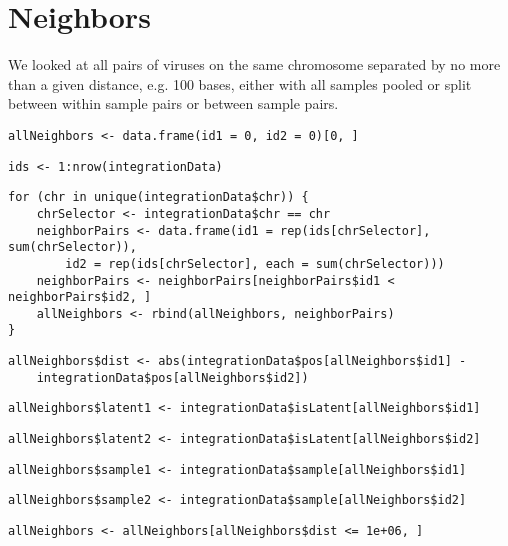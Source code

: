 \documentclass[../../sherrill-Mix_thesis.tex]{subfiles}
\makeatletter
\newenvironment{kframe}{%
 \def\at@end@of@kframe{}%
 \ifinner\ifhmode%
  \def\at@end@of@kframe{\end{minipage}}%
  \begin{minipage}{\columnwidth}%
 \fi\fi%
 \def\FrameCommand##1{\hskip\@totalleftmargin \hskip-\fboxsep
 \colorbox{shadecolor}{##1}\hskip-\fboxsep
     \hskip-\linewidth \hskip-\@totalleftmargin \hskip\columnwidth}%
 \MakeFramed {\advance\hsize-\width
   \@totalleftmargin\z@ \linewidth\hsize
   \@setminipage}}%
 {\par\unskip\endMakeFramed%
 \at@end@of@kframe}
\newenvironment{knitrout}{}{} %
\makeatother
\begin{document}
\section{Neighbors}
We looked at all pairs of viruses on the same chromosome separated by no more than a given distance, e.g. 100 bases, either with all samples pooled or split between within sample pairs or between sample pairs.
\begin{knitrout}
\color{fgcolor}\begin{kframe}
\begin{lstlisting}[basicstyle=\ttfamily,breaklines=true]
allNeighbors <- data.frame(id1 = 0, id2 = 0)[0, ]\end{lstlisting}
\begin{lstlisting}[basicstyle=\ttfamily,breaklines=true]
ids <- 1:nrow(integrationData)\end{lstlisting}
\begin{lstlisting}[basicstyle=\ttfamily,breaklines=true]
for (chr in unique(integrationData$chr)) {
    chrSelector <- integrationData$chr == chr
    neighborPairs <- data.frame(id1 = rep(ids[chrSelector], sum(chrSelector)), 
        id2 = rep(ids[chrSelector], each = sum(chrSelector)))
    neighborPairs <- neighborPairs[neighborPairs$id1 < neighborPairs$id2, ]
    allNeighbors <- rbind(allNeighbors, neighborPairs)
}\end{lstlisting}
\begin{lstlisting}[basicstyle=\ttfamily,breaklines=true]
allNeighbors$dist <- abs(integrationData$pos[allNeighbors$id1] - 
    integrationData$pos[allNeighbors$id2])\end{lstlisting}
\begin{lstlisting}[basicstyle=\ttfamily,breaklines=true]
allNeighbors$latent1 <- integrationData$isLatent[allNeighbors$id1]\end{lstlisting}
\begin{lstlisting}[basicstyle=\ttfamily,breaklines=true]
allNeighbors$latent2 <- integrationData$isLatent[allNeighbors$id2]\end{lstlisting}
\begin{lstlisting}[basicstyle=\ttfamily,breaklines=true]
allNeighbors$sample1 <- integrationData$sample[allNeighbors$id1]\end{lstlisting}
\begin{lstlisting}[basicstyle=\ttfamily,breaklines=true]
allNeighbors$sample2 <- integrationData$sample[allNeighbors$id2]\end{lstlisting}
\begin{lstlisting}[basicstyle=\ttfamily,breaklines=true]
allNeighbors <- allNeighbors[allNeighbors$dist <= 1e+06, ]\end{lstlisting}
\end{kframe}
\end{knitrout}
\end{document}
